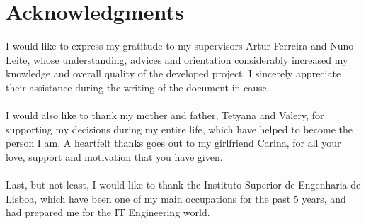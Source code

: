 \chapter*{Acknowledgments}
I would like to express my gratitude to my supervisors Artur Ferreira and Nuno Leite, whose understanding, advices and orientation considerably increased my knowledge and overall quality of the developed project. I sincerely appreciate their assistance during the writing of the document in cause.\\
\\
I would also like to thank my mother and father, Tetyana and Valery, for supporting my decisions during my entire life, which have helped to become the person I am. A heartfelt thanks goes out to my girlfriend Carina, for all your love, support and motivation that you have given.\\
\\
Last, but not least, I would like to thank the Instituto Superior de Engenharia de Lisboa, which have been one of my main occupations for the past 5 years, and had prepared me for the IT Engineering world.

